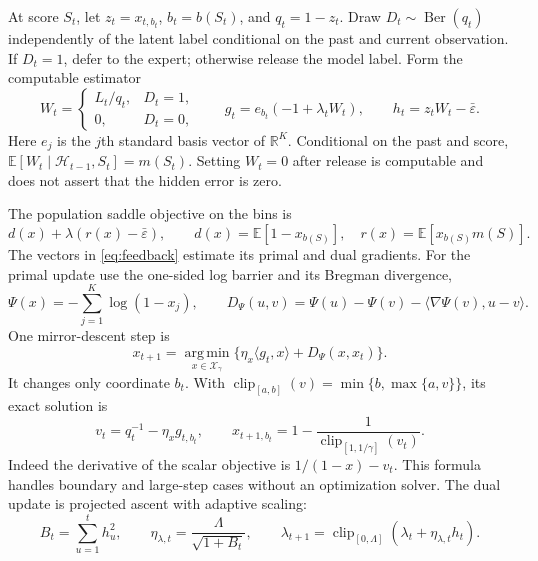 \documentclass[11pt]{article}
\theoremstyle{remark}
\newcommand{\E}{\mathbb E}
\newcommand{\Ber}{\operatorname{Ber}}
\newcommand{\calH}{\mathcal H}
\newcommand{\eps}{\varepsilon}
\newcommand{\clip}{\operatorname{clip}}
\newcommand{\argmin}{\operatorname*{arg\,min}}
\begin{document}
At score $S_t$, let $z_t=x_{t,b_t}$, $b_t=b(S_t)$, and $q_t=1-z_t$.
Draw $D_t\sim\Ber(q_t)$ independently of the latent label conditional
on the past and current observation. If $D_t=1$, defer to the expert;
otherwise release the model label. Form the computable estimator
\begin{equation}
 W_t=\begin{cases}L_t/q_t,&D_t=1,\\0,&D_t=0,\end{cases}
 \qquad
 g_t=e_{b_t}(-1+\lambda_tW_t),\qquad
 h_t=z_tW_t-\bar\eps.
\label{eq:feedback}
\end{equation}
Here $e_j$ is the $j$th standard basis vector of $\mathbb R^K$.
Conditional on the past and score,
$\E[W_t\mid\calH_{t-1},S_t]=m(S_t)$. Setting $W_t=0$ after release
is computable and does not assert that the hidden error is zero.

The population saddle objective on the bins is
\begin{equation}
 d(x)+\lambda(r(x)-\bar\eps),\qquad
 d(x)=\E[1-x_{b(S)}],\quad r(x)=\E[x_{b(S)}m(S)].
 \label{eq:binned-functionals}
\end{equation}
The vectors in \eqref{eq:feedback} estimate its primal and dual gradients.
For the primal update use the one-sided log barrier and its Bregman divergence,
\begin{equation}
 \Psi(x)=-\sum_{j=1}^K\log(1-x_j),\qquad
 D_\Psi(u,v)=\Psi(u)-\Psi(v)-\langle\nabla\Psi(v),u-v\rangle.
 \label{eq:bregman}
\end{equation}
One mirror-descent step is
\begin{equation}
 x_{t+1}=\argmin_{x\in\mathcal X_\gamma}
       \{\eta_x\langle g_t,x\rangle+D_\Psi(x,x_t)\}.
 \label{eq:mirror}
\end{equation}
It changes only coordinate $b_t$. With
$\clip_{[a,b]}(v)=\min\{b,\max\{a,v\}\}$, its exact solution is
\begin{equation}
 v_t=q_t^{-1}-\eta_xg_{t,b_t},\qquad
 x_{t+1,b_t}=1-\frac1{\clip_{[1,1/\gamma]}(v_t)}.
 \label{eq:scalar}
\end{equation}
Indeed the derivative of the scalar objective is $1/(1-x)-v_t$.
This formula handles boundary and large-step cases without an optimization
solver. The dual update is projected ascent with adaptive scaling:
\begin{equation}
 B_t=\sum_{u=1}^t h_u^2,\qquad
 \eta_{\lambda,t}=\frac\Lambda{\sqrt{1+B_t}},\qquad
 \lambda_{t+1}=\clip_{[0,\Lambda]}
            (\lambda_t+\eta_{\lambda,t}h_t).
 \label{eq:dual}
\end{equation}
\end{document}
